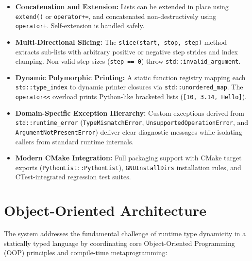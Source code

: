 \documentclass[12pt,a4paper]{report}
\begin{document}
\begin{itemize}
    \item \textbf{Concatenation and Extension:} Lists can be extended in place using \texttt{extend()} or \texttt{operator+=}, and concatenated non-destructively using \texttt{operator+}. Self-extension is handled safely.
    
    \item \textbf{Multi-Directional Slicing:} The \texttt{slice(start, stop, step)} method extracts sub-lists with arbitrary positive or negative step strides and index clamping. Non-valid step sizes (\texttt{step == 0}) throw \texttt{std::invalid\_argument}.
    
    \item \textbf{Dynamic Polymorphic Printing:} A static function registry mapping each \texttt{std::type\_\allowbreak index} to dynamic printer closures via \texttt{std::un\-or\-dered\_\allowbreak map}. The \texttt{operator<<} overload prints Python-like bracketed lists (\texttt{[10, 3.14, Hello]}).
    
    \item \textbf{Domain-Specific Exception Hierarchy:} Custom exceptions derived from \texttt{std::run\-time\_\allowbreak error} (\texttt{Type\-Mis\-match\-Er\-ror}, \texttt{Un\-sup\-port\-ed\-Op\-er\-a\-tion\-Er\-ror}, and \texttt{Ar\-gu\-ment\-Not\-Pre\-sent\-Er\-ror}) deliver clear diagnostic messages while isolating callers from standard runtime internals.
    
    \item \textbf{Modern CMake Integration:} Full packaging support with CMake target exports (\texttt{PythonList::PythonList}), \texttt{GNUInstallDirs} installation rules, and CTest-integrated regression test suites.
\end{itemize}

\newpage
\section{Object-Oriented Architecture}

The system addresses the fundamental challenge of runtime type dynamicity in a statically typed language by coordinating core Object-Oriented Programming (OOP) principles and compile-time metaprogramming:
\end{document}
